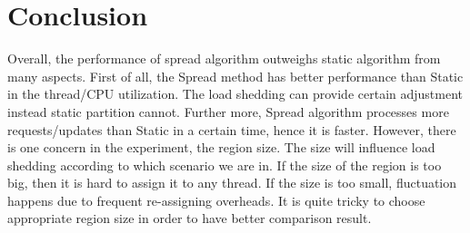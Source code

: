 \documentclass[12pt,a4paper]{article} %
\theoremstyle{definition}
\theoremstyle{remark}
\begin{document}
\section{Conclusion}
Overall, the performance of spread algorithm outweighs static algorithm from many aspects.
First of all, the Spread method has better performance than Static in the thread/CPU utilization. The load shedding can provide certain adjustment instead static partition cannot.
Further more, Spread algorithm processes more requests/updates than Static in a certain time, hence it is faster. However,
there is one concern in the experiment, the region size. The size will influence load shedding according to which scenario we are in. If the size of the region is too big, then it is hard to assign it to any thread. If the size is too small,
fluctuation happens due to frequent re-assigning overheads. It is quite tricky to choose appropriate region size in order to have better comparison result.
\end{document}
